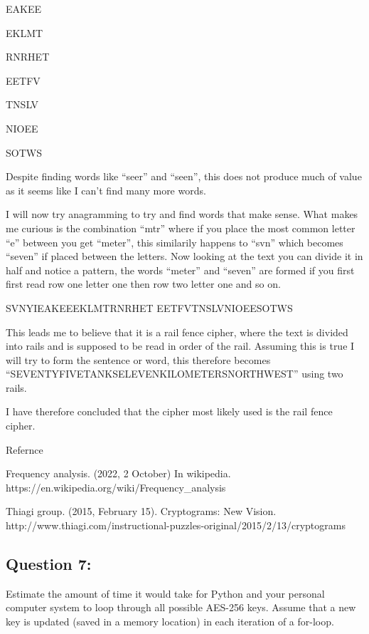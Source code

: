\documentclass[11pt]{article}
\begin{document}
EAKEE

EKLMT

RNRHET

EETFV

TNSLV

NIOEE

SOTWS

Despite finding words like ``seer'' and ``seen'', this does not produce
much of value as it seems like I can't find many more words.

I will now try anagramming to try and find words that make sense. What
makes me curious is the combination ``mtr'' where if you place the most
common letter ``e'' between you get ``meter'', this similarily happens
to ``svn'' which becomes ``seven'' if placed between the letters. Now
looking at the text you can divide it in half and notice a pattern, the
words ``meter'' and ``seven'' are formed if you first first read row one
letter one then row two letter one and so on.

SVNYIEAKEEEKLMTRNRHET EETFVTNSLVNIOEESOTWS

This leads me to believe that it is a rail fence cipher, where the text
is divided into rails and is supposed to be read in order of the rail.
Assuming this is true I will try to form the sentence or word, this
therefore becomes ``SEVENTYFIVETANKSELEVENKILOMETERSNORTHWEST'' using
two rails.

I have therefore concluded that the cipher most likely used is the rail
fence cipher.

Refernce

Frequency analysis. (2022, 2 October) In wikipedia.
https://en.wikipedia.org/wiki/Frequency\_analysis

Thiagi group. (2015, February 15). Cryptograms: New Vision.
http://www.thiagi.com/instructional-puzzles-original/2015/2/13/cryptograms

    \hypertarget{question-7}{%
\subsection{Question 7:}\label{question-7}}

Estimate the amount of time it would take for Python and your personal
computer system to loop through all possible AES-256 keys. Assume that a
new key is updated (saved in a memory location) in each iteration of a
for-loop.
\end{document}
